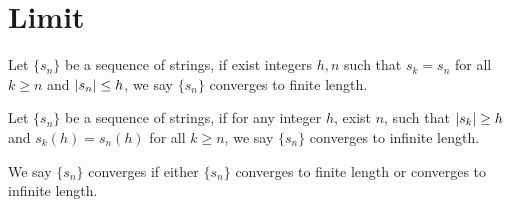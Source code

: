 \section{Limit}
\begin{defi}
Let $\{s_n\}$ be a sequence of strings, 
if exist integers $h, n$ such that $s_k = s_n$
for all $k \geq n$ and $\left| {s_n} \right| \leq h$,
we say $\{s_n\}$ converges to finite length.
\end{defi}

\begin{defi}
Let $\{s_n\}$ be a sequence of strings, 
if for any integer $h$, exist $n$, 
such that $\left| {s_k} \right| \geq h$ and $s_k(h) = s_n(h)$ for all $k \geq n$,
we say $\{s_n\}$ converges to infinite length.
\end{defi}

We say $\{s_n\}$ converges if either $\{s_n\}$ 
converges to finite length or 
converges to infinite length.